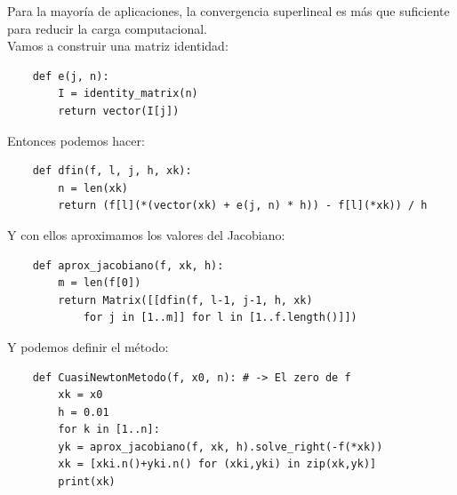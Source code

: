 Para la mayoría de aplicaciones, la convergencia superlineal es más que suficiente para reducir la carga computacional.\\
Vamos a construir una matriz identidad:
\begin{verbatim}
	def e(j, n):
		I = identity_matrix(n)
		return vector(I[j])
\end{verbatim}
Entonces podemos hacer:
\begin{verbatim}
	def dfin(f, l, j, h, xk):
		n = len(xk)
		return (f[l](*(vector(xk) + e(j, n) * h)) - f[l](*xk)) / h
\end{verbatim}
Y con ellos aproximamos los valores del Jacobiano:
\begin{verbatim}
	def aprox_jacobiano(f, xk, h):
		m = len(f[0])
		return Matrix([[dfin(f, l-1, j-1, h, xk) 
		   	for j in [1..m]] for l in [1..f.length()]])
\end{verbatim}
Y podemos definir el método:
\begin{verbatim}
	def CuasiNewtonMetodo(f, x0, n): # -> El zero de f
		xk = x0
		h = 0.01
		for k in [1..n]:
		yk = aprox_jacobiano(f, xk, h).solve_right(-f(*xk))
		xk = [xki.n()+yki.n() for (xki,yki) in zip(xk,yk)]
		print(xk)
\end{verbatim}

